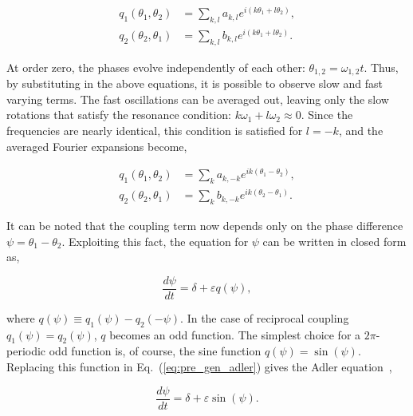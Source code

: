 \begin{align*}
    q_1(\theta_1, \theta_2) &= \sum_{k,l} a_{k,l} e^{i(k\theta_1 + l\theta_2)},\\
    q_2(\theta_2, \theta_1) &= \sum_{k,l} b_{k,l} e^{i(k\theta_1 + l\theta_2)}.
\end{align*}

At order zero, the phases evolve independently of each other: $\theta_{1,2} = \omega_{1,2} t$.
Thus, by substituting in the above equations, it is possible to observe slow and fast varying terms.
The fast oscillations can be averaged out, leaving only the slow rotations that satisfy the resonance
condition: $k\omega_1 + l\omega_2 \approx 0$. Since the frequencies are nearly identical, this
condition is satisfied for $l = -k$, and the averaged Fourier expansions become,

\begin{align*}
    q_1(\theta_1, \theta_2) &= \sum_{k} a_{k,-k} e^{ik(\theta_1 - \theta_2)},\\
    q_2(\theta_2, \theta_1) &= \sum_{k} b_{k,-k} e^{ik(\theta_2 - \theta_1)}.
\end{align*}

It can be noted that the coupling term now depends only on the phase difference
$\psi = \theta_1 - \theta_2$. Exploiting this fact, the equation for $\psi$ can be written
in closed form as,

\begin{equation}
    \dfrac{d\psi}{dt} = \delta + \varepsilon q(\psi),
    \label{eq:pre_gen_adler}
\end{equation}

\noindent where $q(\psi) \equiv q_1(\psi) - q_2(-\psi)$. In the case of reciprocal coupling $q_1(\psi) = q_2(\psi)$,
$q$ becomes an odd function. The simplest choice for a $2\pi$-periodic odd function is, of course, 
the sine function $q(\psi) = \sin(\psi)$. Replacing this function in Eq.~(\ref{eq:pre_gen_adler})
gives the Adler equation~\cite{adler1946study},

\begin{equation}
    \dfrac{d\psi}{dt} = \delta + \varepsilon \sin(\psi).
    \label{eq:pre_adler}
\end{equation}

